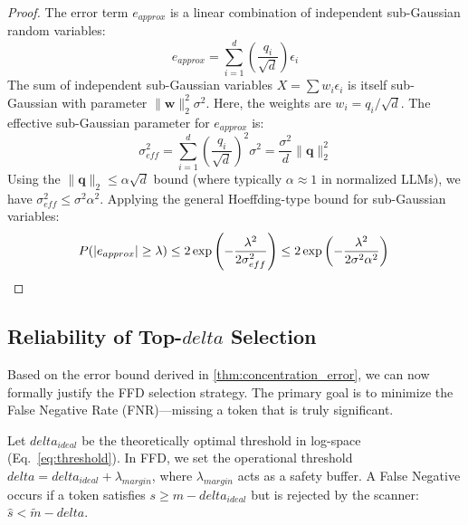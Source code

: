 \documentclass[]{mosi}
\def\delta{delta}%
\theoremstyle{plain}
\theoremstyle{definition}
\theoremstyle{remark}
\begin{document}
\begin{proof}
The error term $e_{approx}$ is a linear combination of independent sub-Gaussian random variables:
\begin{equation}
    e_{approx} = \sum_{i=1}^d \left( \frac{q_i}{\sqrt{d}} \right) \epsilon_i
\end{equation}
The sum of independent sub-Gaussian variables $X = \sum w_i \epsilon_i$ is itself sub-Gaussian with parameter $\|\mathbf{w}\|_2^2 \sigma^2$. Here, the weights are $w_i = q_i / \sqrt{d}$. The effective sub-Gaussian parameter for $e_{approx}$ is:
\begin{equation}
    \sigma_{eff}^2 = \sum_{i=1}^d \left( \frac{q_i}{\sqrt{d}} \right)^2 \sigma^2 = \frac{\sigma^2}{d} \|\mathbf{q}\|_2^2
\end{equation}
Using the $\| \mathbf{q} \|_2 \le \alpha \sqrt{d}$ bound (where typically $\alpha \approx 1$ in normalized LLMs), we have $\sigma_{eff}^2 \le \sigma^2 \alpha^2$. Applying the general Hoeffding-type bound for sub-Gaussian variables:
\begin{equation}
    P(|e_{approx}| \ge \lambda) \le 2 \exp \left( -\frac{\lambda^2}{2 \sigma_{eff}^2} \right) \le 2 \exp \left( -\frac{\lambda^2}{2 \sigma^2 \alpha^2} \right) \qedhere
\end{equation}
\end{proof}

\subsection{Reliability of Top-$\delta$ Selection}

Based on the error bound derived in \cref{thm:concentration_error}, we can now formally justify the FFD selection strategy. The primary goal is to minimize the False Negative Rate (FNR)---missing a token that is truly significant.

Let $\delta_{ideal}$ be the theoretically optimal threshold in log-space (Eq.~\ref{eq:threshold}). In FFD, we set the operational threshold $\delta = \delta_{ideal} + \lambda_{margin}$, where $\lambda_{margin}$ acts as a safety buffer. 
A False Negative occurs if a token satisfies $s \ge m - \delta_{ideal}$ but is rejected by the scanner: $\hat{s} < \tilde{m} - \delta$. 
\end{document}
